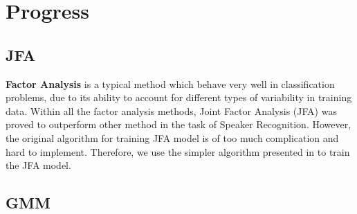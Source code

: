 
\section{Progress}
\subsection{JFA}
\textbf{Factor Analysis} is a typical method which behave
very well in classification problems, due to its ability to
account for different types of variability in training data.
Within all the factor analysis methods,
Joint Factor Analysis (JFA)\cite{jfa2,jfa-se} was proved to outperform other method
in the task of Speaker Recognition.
However, the original algorithm \cite{jfa-se} for training JFA model is of
too much complication and hard to implement.
Therefore, we use the simpler algorithm presented in \cite{jfa-study}
to train the JFA model.

\subsection{GMM}
